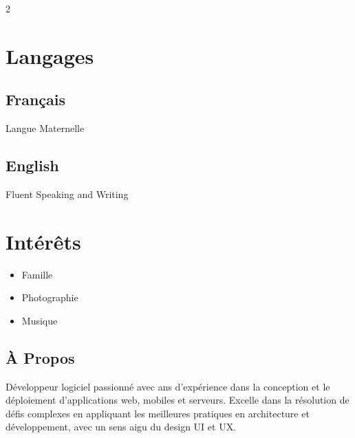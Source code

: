 \documentclass{article}
\begin{document}
\begin{paracol}{2}
\begin{leftcolumn}
    \section{Langages}

    \subsection{Français}
    Langue Maternelle

    \vspace{0.5em}

    \subsection{English}
    Fluent Speaking and Writing

    \section{Intérêts}

    \begin{itemize}
      \item Famille
      \item Photographie
      \item Musique
    \end{itemize}


  \end{leftcolumn}
  \begin{rightcolumn}

    \vspace{-2.5em}
    \section{À Propos}

    Développeur logiciel passionné avec  ans d’expérience dans la conception et le
    déploiement d’applications web, mobiles et serveurs. Excelle dans la résolution de défis complexes en
    appliquant les meilleures pratiques en architecture et développement, avec un sens aigu du design UI et UX. 


\end{rightcolumn}
\end{paracol}
\end{document}
